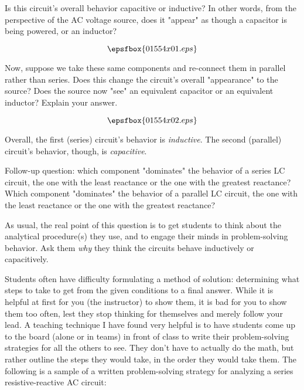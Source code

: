 

Is this circuit's overall behavior capacitive or inductive?  In other words, from the perspective of the AC voltage source, does it "appear" as though a capacitor is being powered, or an inductor?

$$\epsfbox{01554x01.eps}$$

Now, suppose we take these same components and re-connect them in parallel rather than series.  Does this change the circuit's overall "appearance" to the source?  Does the source now "see" an equivalent capacitor or an equivalent inductor?  Explain your answer.

$$\epsfbox{01554x02.eps}$$







Overall, the first (series) circuit's behavior is {\it inductive}.  The second (parallel) circuit's behavior, though, is {\it capacitive}.

\vskip 10pt

Follow-up question: which component "dominates" the behavior of a series LC circuit, the one with the least reactance or the one with the greatest reactance?  Which component "dominates" the behavior of a parallel LC circuit, the one with the least reactance or the one with the greatest reactance?







As usual, the real point of this question is to get students to think about the analytical procedure(s) they use, and to engage their minds in problem-solving behavior.  Ask them {\it why} they think the circuits behave inductively or capacitively.

\vskip 10pt

Students often have difficulty formulating a method of solution: determining what steps to take to get from the given conditions to a final answer.  While it is helpful at first for you (the instructor) to show them, it is bad for you to show them too often, lest they stop thinking for themselves and merely follow your lead.  A teaching technique I have found very helpful is to have students come up to the board (alone or in teams) in front of class to write their problem-solving strategies for all the others to see.  They don't have to actually do the math, but rather outline the steps they would take, in the order they would take them.  The following is a sample of a written problem-solving strategy for analyzing a series resistive-reactive AC circuit:


